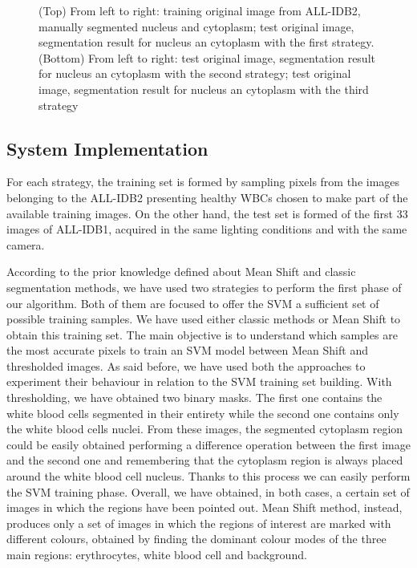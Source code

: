 \documentclass[final,a4paper,12pt,english]{UnicaPhdThesis3}
\begin{document}
\begin{figure}[!b]
	\caption{\label{fig:exs} (Top) From left to right: training original image from ALL-IDB2, manually segmented nucleus and cytoplasm; test original image, segmentation result for nucleus an cytoplasm with the first strategy. (Bottom) From left to right: test original image, segmentation result for nucleus an cytoplasm with the second strategy; test original image, segmentation result for nucleus an cytoplasm with the third strategy}
\end{figure}

\subsection{System Implementation}
For each strategy, the training set is formed by sampling pixels from the images belonging to the ALL-IDB2 presenting healthy WBCs chosen to make part of the available training images. On the other hand, the test set is formed of the first 33 images of ALL-IDB1, acquired in the same lighting conditions and with the same camera. 

According to the prior knowledge defined about Mean Shift and classic segmentation methods, we have used two strategies to perform the first phase of our algorithm. Both of them are focused to offer the SVM a sufficient set of possible training samples. We have used either classic methods or Mean Shift to obtain this training set. The main objective is to understand which samples are the most accurate pixels to train an SVM model between Mean Shift and thresholded images. As said before, we have used both the approaches to experiment their behaviour in relation to the SVM training set building. With thresholding, we have obtained two binary masks. The first one contains the white blood cells segmented in their entirety while the second one contains only the white blood cells nuclei.
From these images, the segmented cytoplasm region could be easily obtained performing a difference operation between the first image and the second one and remembering that the cytoplasm region is always placed around the white blood cell nucleus. Thanks to this process we can easily perform the SVM training phase. Overall, we have obtained, in both cases, a certain set of images in which the regions have been pointed out. Mean Shift method, instead, produces only a set of images in which the regions of interest are marked with different colours, obtained by finding the dominant colour modes of the three main regions: erythrocytes, white blood cell and background. 
\end{document}

